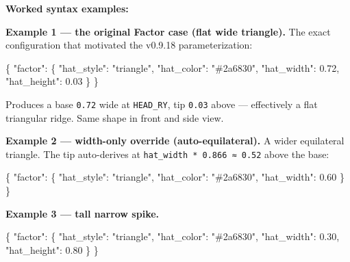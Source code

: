 \documentclass[
  11pt,
]{book}
\newenvironment{Shaded}{}{}
\newcommand{\DataTypeTok}[1]{\textcolor[rgb]{0.56,0.13,0.00}{#1}}
\newcommand{\FloatTok}[1]{\textcolor[rgb]{0.25,0.63,0.44}{#1}}
\newcommand{\FunctionTok}[1]{\textcolor[rgb]{0.02,0.16,0.49}{#1}}
\newcommand{\StringTok}[1]{\textcolor[rgb]{0.25,0.44,0.63}{#1}}
\begin{document}
\textbf{Worked syntax examples:}

\textbf{Example 1 --- the original Factor case (flat wide
triangle).} The exact configuration that motivated the v0.9.18
parameterization:

\begin{Shaded}
\begin{Highlighting}[]
\FunctionTok{\{}
  \DataTypeTok{"factor"}\FunctionTok{:} \FunctionTok{\{}
    \DataTypeTok{"hat\_style"}\FunctionTok{:}  \StringTok{"triangle"}\FunctionTok{,}
    \DataTypeTok{"hat\_color"}\FunctionTok{:}  \StringTok{"\#2a6830"}\FunctionTok{,}
    \DataTypeTok{"hat\_width"}\FunctionTok{:}  \FloatTok{0.72}\FunctionTok{,}
    \DataTypeTok{"hat\_height"}\FunctionTok{:} \FloatTok{0.03}
  \FunctionTok{\}}
\FunctionTok{\}}
\end{Highlighting}
\end{Shaded}

Produces a base \texttt{0.72} wide at \texttt{HEAD\_RY}, tip
\texttt{0.03} above --- effectively a flat triangular ridge. Same shape
in front and side view.

\textbf{Example 2 --- width-only override (auto-equilateral).} A
wider equilateral triangle. The tip auto-derives at
\texttt{hat\_width\ *\ 0.866\ ≈\ 0.52} above the base:

\begin{Shaded}
\begin{Highlighting}[]
\FunctionTok{\{}
  \DataTypeTok{"factor"}\FunctionTok{:} \FunctionTok{\{}
    \DataTypeTok{"hat\_style"}\FunctionTok{:}  \StringTok{"triangle"}\FunctionTok{,}
    \DataTypeTok{"hat\_color"}\FunctionTok{:}  \StringTok{"\#2a6830"}\FunctionTok{,}
    \DataTypeTok{"hat\_width"}\FunctionTok{:}  \FloatTok{0.60}
  \FunctionTok{\}}
\FunctionTok{\}}
\end{Highlighting}
\end{Shaded}

\textbf{Example 3 --- tall narrow spike.}

\begin{Shaded}
\begin{Highlighting}[]
\FunctionTok{\{}
  \DataTypeTok{"factor"}\FunctionTok{:} \FunctionTok{\{}
    \DataTypeTok{"hat\_style"}\FunctionTok{:}  \StringTok{"triangle"}\FunctionTok{,}
    \DataTypeTok{"hat\_color"}\FunctionTok{:}  \StringTok{"\#2a6830"}\FunctionTok{,}
    \DataTypeTok{"hat\_width"}\FunctionTok{:}  \FloatTok{0.30}\FunctionTok{,}
    \DataTypeTok{"hat\_height"}\FunctionTok{:} \FloatTok{0.80}
  \FunctionTok{\}}
\FunctionTok{\}}
\end{Highlighting}
\end{Shaded}
\end{document}
